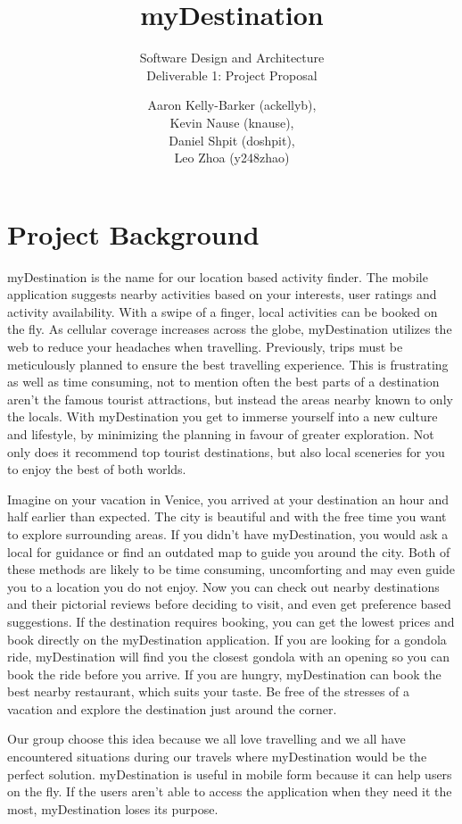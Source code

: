 \documentclass{article}
\author{Aaron Kelly-Barker (ackellyb), \\Kevin Nause (knause), \\Daniel Shpit (doshpit), \\Leo Zhoa (y248zhao)}
\title{myDestination}
\subtitle{Software Design and Architecture \\Deliverable 1: Project Proposal}
\begin{document}
\maketitle
\pagebreak
\section{Project Background}
myDestination is the name for our location based activity finder. The mobile application suggests nearby activities based on your interests, user ratings and activity availability. With a swipe of a finger, local activities can be booked on the fly. As cellular coverage increases across the globe, myDestination utilizes the web to reduce your headaches when travelling. Previously, trips must be meticulously planned to ensure the best travelling experience. This is frustrating as well as time consuming, not to mention often the best parts of a destination aren't the famous tourist attractions, but instead the areas nearby known to only the locals.  With myDestination you get to immerse yourself into a new culture and lifestyle, by minimizing the planning in favour of greater exploration.  Not only does it recommend top tourist destinations, but also local sceneries for you to enjoy the best of both worlds.

Imagine on your vacation in Venice, you arrived at your destination an hour and half earlier than expected. The city is beautiful and with the free time you want to explore surrounding areas. If you didn't have myDestination, you would ask a local for guidance or find an outdated map to guide you around the city. Both of these methods are likely to be time consuming, uncomforting and may even guide you to a location you do not enjoy. Now you can check out nearby destinations and their pictorial reviews before deciding to visit, and even get preference based suggestions. If the destination requires booking, you can get the lowest prices and book directly on the myDestination application. If you are looking for a gondola ride, myDestination will find you the closest gondola with an opening so you can book the ride before you arrive. If you are hungry, myDestination can book the best nearby restaurant, which suits your taste. Be free of the stresses of a vacation and explore the destination just around the corner.

Our group choose this idea because we all love travelling and we all have encountered situations during our travels where myDestination would be the perfect solution. myDestination is useful in mobile form because it can help users on the fly. If the users aren't able to access the application when they need it the most, myDestination loses its purpose.
\end{document}
